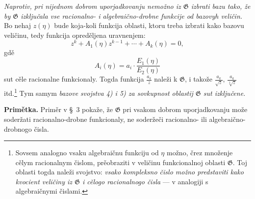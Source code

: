 \documentclass[11pt]{article}
\begin{document}
{\itshape Naprotiv, pri nijednom dobrom uporjadkovanju nemožno iz $\mathfrak G$ izbrati bazu tako, že by $\mathfrak G$ izključala vse racionalno- i algebraično-drobne funkcije od bazovyh veličin.} Bo nehaj $z(\eta)$ bude koja-koli funkcija oblasti, ktoru treba izbrati kako bazovu veličinu, tedy funkcija opreděljena uravnenjem:
\[
 z^k+A_1(\eta)z^{k-1}+\cdots+A_k(\eta)=0,
\]
gdě
\[
 A_i(\eta)=a_i\cdot\frac{E_1(\eta)}{E_2(\eta)}
\]
sut cěle racionalne funkcionaly. Togda funkcija $\frac{a_k}{z}$ naleži k $\mathfrak G$, i takože $\frac{a_k}{\sqrt z}$, $\frac{a_k}{\sqrt[3]z}$ itd.\footnote{Sovsem analogno vsaku algebraičnu funkciju od $\eta$ možno, črez množenje cělym racionalnym čislom, prěobraziti v veličinu funkcionalnoj oblasti $\mathfrak G$. Toj oblasti togda naleži svojstvo: {\itshape vsako kompleksno čislo možno predstaviti kako kvocient veličiny iz $\mathfrak G$ i cělogo racionalnogo čisla} --- v analogiji s algebraičnymi čislami.} Tym samym {\itshape bazove svojstva 4) i 5) za sovkupnost oblastij $\mathfrak G$ sut izključene.}

\textbf{Primětka.} Priměr v \S\ 3 pokaže, že $\mathfrak G$ pri vsakom dobrom uporjadkovanju može soderžati racionalno-drobne funkcionaly, ne soderžeči racionalno- ili algebraično-drobnogo čisla.
\end{document}

